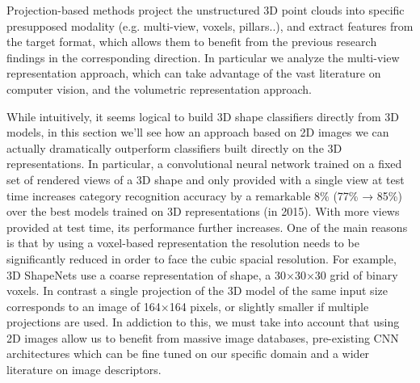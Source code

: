 Projection-based methods project the unstructured 3D point clouds into specific presupposed modality (e.g. multi-view, voxels, pillars..), and extract features from the target format, which allows them to benefit from the previous research findings in the corresponding direction. In particular we analyze the multi-view representation approach, which can take advantage of the vast literature on computer vision, and the volumetric representation approach.

While intuitively, it seems logical to build 3D shape classifiers directly from 3D models, in this section we'll see how an approach based on 2D images we can actually dramatically outperform classifiers built directly on the 3D representations. In particular, a convolutional neural network trained on a fixed set of rendered views of a 3D shape and only provided with a single view at test time increases category recognition accuracy by a remarkable 8\% (77\% → 85\%) over the best models trained on 3D representations (in 2015). With more views provided at test time, its performance further increases. One of the main reasons is that by using a voxel-based representation the resolution needs to be significantly reduced in order to face the cubic spacial resolution. For example, 3D ShapeNets use a coarse representation of
shape, a 30×30×30 grid of binary voxels. In contrast a single projection of the 3D model of the same input size corresponds to an image of 164×164 pixels, or slightly smaller if multiple projections are used. In addiction to this, we must take into account that using 2D images allow us to benefit from massive image databases, pre-existing CNN architectures which can be fine tuned on our specific domain and a wider literature on image descriptors.